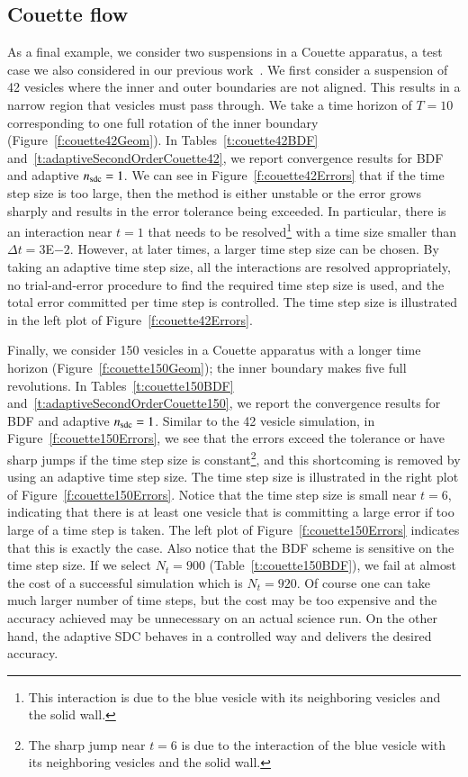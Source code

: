 \subsection{Couette flow}
\label{s:couette}
As a final example, we consider two suspensions in a Couette apparatus,
a test case we also considered in our previous
work~\cite{qua:bir2014b}.  We first consider a suspension of 42
vesicles where the inner and outer boundaries are not aligned.  This
results in a narrow region that vesicles must pass through.  We take a
time horizon of $T=10$ corresponding to one full rotation of the inner
boundary (Figure~\ref{f:couette42Geom}).  In
Tables~\ref{t:couette42BDF} and~\ref{t:adaptiveSecondOrderCouette42},
we report convergence results for BDF and adaptive $n_{{\mathrm{sdc}}}=1$.  We
can see in Figure~\ref{f:couette42Errors} that if the time step size is
too large, then the method is either unstable or the error grows
sharply and results in the error tolerance being exceeded.  In
particular, there is an interaction near $t=1$ that needs to be
resolved\footnote{This interaction is due to the blue vesicle with its
neighboring vesicles and the solid wall.} with a time size smaller than
$\Delta t = 3$E$-2$.  However, at later times, a larger time step size
can be chosen.  By taking an adaptive time step size, all the
interactions are resolved appropriately, no trial-and-error procedure
to find the required time step size is used, and the total error
committed per time step is controlled.  The time step size is
illustrated in the left plot of Figure~\ref{f:couette42Errors}.

Finally, we consider 150 vesicles in a Couette apparatus with a longer
time horizon (Figure~\ref{f:couette150Geom}); the inner boundary makes
five full revolutions.  In Tables~\ref{t:couette150BDF}
and~\ref{t:adaptiveSecondOrderCouette150}, we report the convergence
results for BDF and adaptive $n_{{\mathrm{sdc}}}=1$.  Similar to the 42 vesicle
simulation, in Figure~\ref{f:couette150Errors}, we see that the errors
exceed the tolerance or have sharp jumps if the time step size is
constant\footnote{The sharp jump near $t=6$ is due to the interaction of
the blue vesicle with its neighboring vesicles and the solid wall.}, and
this shortcoming is removed by using an adaptive time step size.  The
time step size is illustrated in the right plot of
Figure~\ref{f:couette150Errors}.  Notice that the time step size is
small near $t=6$, indicating that there is at least one vesicle that is
committing a large error if too large of a time step is taken.  The left
plot of Figure~\ref{f:couette150Errors} indicates that this is exactly
the case.  Also notice that the BDF scheme is sensitive on the time step
size.  If we select $N_{t}=900$ (Table~\ref{t:couette150BDF}), we fail
at almost the cost of a successful simulation which is $N_{t}=920$.  Of
course one can take much larger number of time steps, but the cost may
be too expensive and the accuracy achieved may be unnecessary on an
actual science run.  On the other hand, the adaptive SDC behaves in a
controlled way and delivers the desired accuracy.

